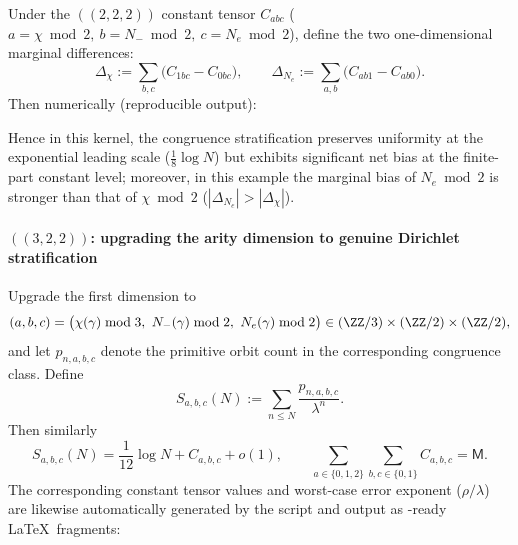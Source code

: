 \begin{remark}\label{cor:real-input-40-mertens-222-marginal-bias}
Under the \(((2,2,2))\) constant tensor \(C_{abc}\) (\(a=\chi\bmod 2,\ b=N_-\bmod 2,\ c=N_e\bmod 2\)), define the two one-dimensional marginal differences:
\[
\Delta_\chi:=\sum_{b,c}\bigl(C_{1bc}-C_{0bc}\bigr),\qquad
\Delta_{N_e}:=\sum_{a,b}\bigl(C_{ab1}-C_{ab0}\bigr).
\]
Then numerically (reproducible output):

Hence in this kernel, the congruence stratification preserves uniformity at the exponential leading scale (\(\tfrac18\log N\)) but exhibits significant net bias at the finite-part constant level;
moreover, in this example the marginal bias of \(N_e\bmod 2\) is stronger than that of \(\chi\bmod 2\) (\(|\Delta_{N_e}|>|\Delta_\chi|\)).
\end{remark}

\paragraph{\texorpdfstring{$((3,2,2))$}{(3,2,2)}: upgrading the arity dimension to genuine Dirichlet stratification}
Upgrade the first dimension to
$$
(a,b,c)=\bigl(\chi(\gamma)\bmod 3,\ N_-(\gamma)\bmod 2,\ N_e(\gamma)\bmod 2\bigr)\in(\ZZ/3)\times(\ZZ/2)\times(\ZZ/2),
$$
and let $p_{n,a,b,c}$ denote the primitive orbit count in the corresponding congruence class. Define
$$
S_{a,b,c}(N):=\sum_{n\le N}\frac{p_{n,a,b,c}}{\lambda^n}.
$$
Then similarly
$$
S_{a,b,c}(N)=\frac{1}{12}\log N + C_{a,b,c}+o(1),
\qquad
\sum_{a\in\{0,1,2\}}\sum_{b,c\in\{0,1\}}C_{a,b,c}=\mathsf{M}.
$$
The corresponding constant tensor values and worst-case error exponent ($\rho/\lambda$) are likewise automatically generated by the script
and output as \verb||-ready \LaTeX\ fragments:


